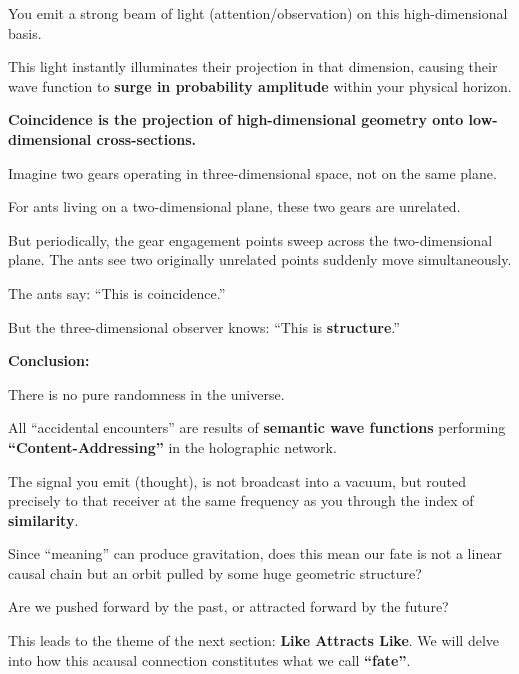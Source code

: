 You emit a strong beam of light (attention/observation) on this high-dimensional basis.

This light instantly illuminates their projection in that dimension, causing their wave function to \textbf{surge in probability amplitude} within your physical horizon.

\textbf{Coincidence is the projection of high-dimensional geometry onto low-dimensional cross-sections.}

Imagine two gears operating in three-dimensional space, not on the same plane.

For ants living on a two-dimensional plane, these two gears are unrelated.

But periodically, the gear engagement points sweep across the two-dimensional plane. The ants see two originally unrelated points suddenly move simultaneously.

The ants say: ``This is coincidence.''

But the three-dimensional observer knows: ``This is \textbf{structure}.''


\textbf{Conclusion:}

There is no pure randomness in the universe.

All ``accidental encounters'' are results of \textbf{semantic wave functions} performing \textbf{``Content-Addressing''} in the holographic network.

The signal you emit (thought), is not broadcast into a vacuum, but routed precisely to that receiver at the same frequency as you through the index of \textbf{similarity}.

Since ``meaning'' can produce gravitation, does this mean our fate is not a linear causal chain but an orbit pulled by some huge geometric structure?

Are we pushed forward by the past, or attracted forward by the future?

This leads to the theme of the next section: \textbf{Like Attracts Like}. We will delve into how this acausal connection constitutes what we call \textbf{``fate''}.

